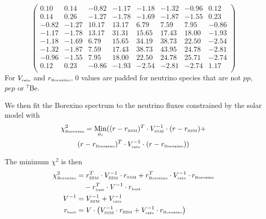 \documentclass[aps,prd,reprint,superscriptaddress,floatfix,altaffilletter,nofootinbib]{revtex4-2}
\begin{document}
{\footnotesize 
\[
\begin{pmatrix}
  0.10 &  0.14 & -0.82 & -1.17 & -1.18 & -1.32 & -0.96 &  0.12 \\
  0.14 &  0.26 & -1.27 & -1.78 & -1.69 & -1.87 & -1.55 &  0.23 \\
 -0.82 & -1.27 & 10.17 & 13.17 &  6.79 &  7.59 &  7.95 & -0.86 \\
 -1.17 & -1.78 & 13.17 & 31.31 & 15.65 & 17.43 & 18.00 & -1.93 \\
 -1.18 & -1.69 &  6.79 & 15.65 & 34.19 & 38.73 & 22.50 & -2.54 \\
 -1.32 & -1.87 &  7.59 & 17.43 & 38.73 & 43.95 & 24.78 & -2.81 \\
 -0.96 & -1.55 &  7.95 & 18.00 & 22.50 & 24.78 & 25.71 & -2.74 \\
  0.12 &  0.23 & -0.86 & -1.93 & -2.54 & -2.81 & -2.74 &  1.17 \\
\end{pmatrix}
\]
}
\noindent 
For $V_{\mbox{\tiny rate}}$ and $r_{\mbox{\tiny Borexino}}$, 0 values are padded for neutrino species that are not $pp$, $pep$ or $^7$Be.

We then fit the Borexino spectrum to the neutrino fluxes constrained by the solar model
with
\begin{multline}
     \chi^{2}_{\mbox{\tiny Borexino}} = 
     \underset{\phi_i}{\rm{Min}} 
     (
        (r - r_{\mbox{\tiny SSM}})^T      \cdot V^{-1}_{\mbox{\tiny SSM}}  \cdot (r - r_{\mbox{\tiny SSM}}) + \\ 
        (r - r_{\mbox{\tiny Borexino}})^T \cdot V^{-1}_{\mbox{\tiny rate}} \cdot (r - r_{\mbox{\tiny Borexino}})
     )
    \notag
\end{multline}

\noindent The minimum $\chi^2$ is then
\begin{align*}
    \chi^2_{\mbox{\tiny Borexino}} &=r_{\mbox{\tiny SSM}}^T \cdot V^{-1}_{\mbox{\tiny SSM}} \cdot r_{\mbox{\tiny SSM}} + r_{\mbox{\tiny Borexino}}^T \cdot V^{-1}_{\mbox{\tiny rate}} \cdot r_{\mbox{\tiny Borexino}} \\ 
    & \quad - r_{\mbox{\tiny best}}^T \cdot V^{-1} \cdot r_{\mbox{\tiny best}} \\
    V^{-1} &=V^{-1}_{\mbox{\tiny SSM}}+V^{-1}_{\mbox{\tiny rate}}  \\
    r_{\mbox{\tiny best}} &= V\cdot \left( 
        V^{-1}_{\mbox{\tiny SSM}}  \cdot r_{\mbox{\tiny SSM}} +
        V^{-1}_{\mbox{\tiny rate}} \cdot r_{\mbox{\tiny Borexino}}
        \right) 
\end{align*}
\end{document}
